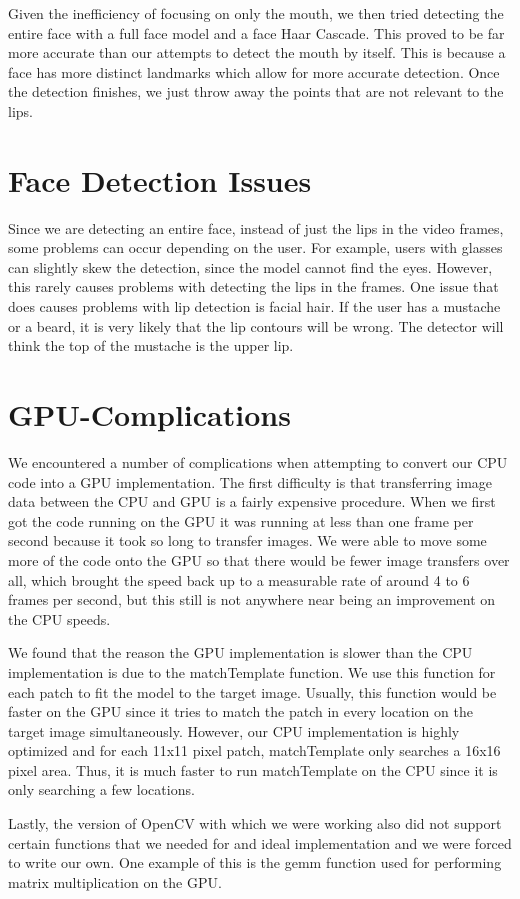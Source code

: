 Given the inefficiency of focusing on only the mouth, we then tried detecting the entire face with a full face model and a face Haar Cascade. This proved to be far more accurate than our attempts to detect the mouth by itself. This is because a face has more distinct landmarks which allow for more accurate detection. Once the detection finishes, we just throw away the points that are not relevant to the lips.

\section{Face Detection Issues}
Since we are detecting an entire face, instead of just the lips in the video frames, some problems can occur depending on the user. For example, users with glasses can slightly skew the detection, since the model cannot find the eyes. However, this rarely causes problems with detecting the lips in the frames. One issue that does causes problems with lip detection is facial hair. If the user has a mustache or a beard, it is very likely that the lip contours will be wrong. The detector will think the top of the mustache is the upper lip.

\section{GPU-Complications}

We encountered a number of complications when attempting to convert our CPU code into a GPU implementation. The first difficulty is that transferring image data between the CPU and GPU is a fairly expensive procedure. When we first got the code running on the GPU it was running at less than one frame per second because it took so long to transfer images. We were able to move some more of the code onto the GPU so that there would be fewer image transfers over all, which brought the speed back up to a measurable rate of around 4 to 6 frames per second, but this still is not anywhere near being an improvement on the CPU speeds.

We found that the reason the GPU implementation is slower than the CPU implementation is due to the matchTemplate function. We use this function for each patch to fit the model to the target image. Usually, this function would be faster on the GPU since it tries to match the patch in every location on the target image simultaneously. However, our CPU implementation is highly optimized and for each 11x11 pixel patch, matchTemplate only searches a 16x16 pixel area. Thus, it is much faster to run matchTemplate on the CPU since it is only searching a few locations.

Lastly, the version of OpenCV with which we were working also did not support certain functions that we needed for and ideal implementation and we were forced to write our own. One example of this is the gemm function used for performing matrix multiplication on the GPU.